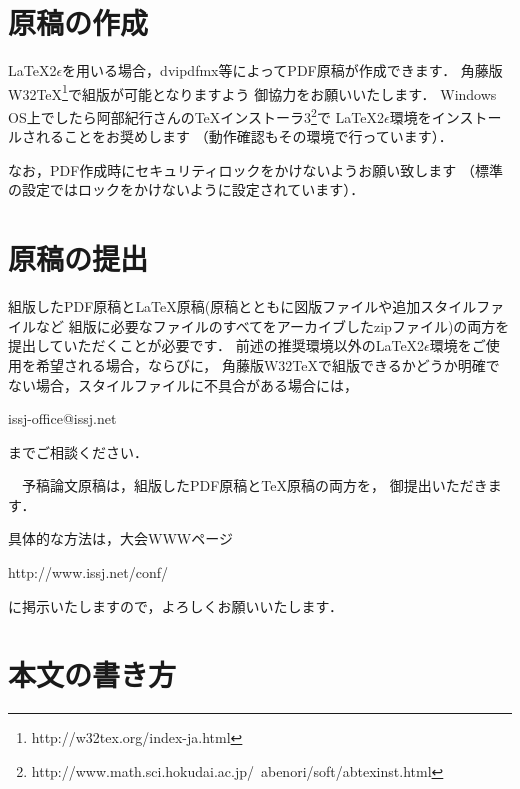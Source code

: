 \documentclass[dvipdfmx]{issj}
\begin{document}
\section{原稿の作成}  %

\LaTeX 2$\epsilon$を用いる場合，dvipdfmx等によってPDF原稿が作成できます．
角藤版W32{\TeX}\footnote{http://w32tex.org/index-ja.html}で組版が可能となりますよう
御協力をお願いいたします．
Windows OS上でしたら阿部紀行さんのTeXインストーラ3\footnote{%
http://www.math.sci.hokudai.ac.jp/~abenori/soft/abtexinst.html}で
\LaTeX 2$\epsilon$環境をインストールされることをお奨めします
（動作確認もその環境で行っています）．

なお，PDF作成時にセキュリティロックをかけないようお願い致します
（標準の設定ではロックをかけないように設定されています）．

\section{原稿の提出}  %

組版したPDF原稿と{\LaTeX}原稿(原稿とともに図版ファイルや追加スタイルファイルなど
組版に必要なファイルのすべてをアーカイブしたzipファイル)の両方を
提出していただくことが必要です．
前述の推奨環境以外の\LaTeX 2$\epsilon$環境をご使用を希望される場合，ならびに，
角藤版W32TeXで組版できるかどうか明確でない場合，スタイルファイルに不具合がある場合には，
\begin{center}
    issj-office@issj.net
\end{center}
までご相談ください．

　予稿論文原稿は，組版したPDF原稿とTeX原稿の両方を，
御提出いただきます．

具体的な方法は，大会WWWページ
\begin{center}
    http://www.issj.net/conf/
\end{center}
に掲示いたしますので，よろしくお願いいたします．


\section{本文の書き方}  %
\end{document}
